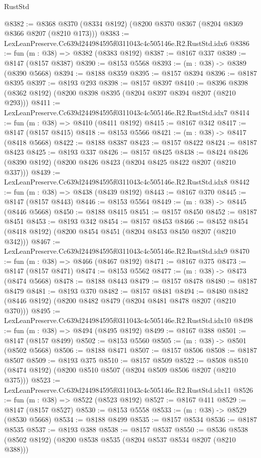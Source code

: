 \begin{lexlean}{RustStd}
\begin{coremodule}
@8382 := @8368 @8370 (@8334 @8192) (@8200 @8370 @8367 (@8204 @8369 @8366 @8207 (@8210 @173)))
@8383 := LexLeanPreserve.Cc639d244984595f0311043c4c505146e.R2.RustStd.idx6
@8386 := fun (m : @38) => @8382 (@8383 @8192)
@8387 := @8167 @337
@8389 := @8147 (@8157 @8387)
@8390 := @8153 @5568
@8393 := (m : @38) -> @8389 (@8390 @5668)
@8394 := @8188 @8359
@8395 := @8157 @8394
@8396 := @8187 @8395
@8397 := @8193 @293
@8398 := @8157 @8397
@8410 := @8396 @8398 (@8362 @8192) (@8200 @8398 @8395 (@8204 @8397 @8394 @8207 (@8210 @293)))
@8411 := LexLeanPreserve.Cc639d244984595f0311043c4c505146e.R2.RustStd.idx7
@8414 := fun (m : @38) => @8410 (@8411 @8192)
@8415 := @8167 @342
@8417 := @8147 (@8157 @8415)
@8418 := @8153 @5566
@8421 := (m : @38) -> @8417 (@8418 @5668)
@8422 := @8188 @8387
@8423 := @8157 @8422
@8424 := @8187 @8423
@8425 := @8193 @337
@8426 := @8157 @8425
@8438 := @8424 @8426 (@8390 @8192) (@8200 @8426 @8423 (@8204 @8425 @8422 @8207 (@8210 @337)))
@8439 := LexLeanPreserve.Cc639d244984595f0311043c4c505146e.R2.RustStd.idx8
@8442 := fun (m : @38) => @8438 (@8439 @8192)
@8443 := @8167 @370
@8445 := @8147 (@8157 @8443)
@8446 := @8153 @5564
@8449 := (m : @38) -> @8445 (@8446 @5668)
@8450 := @8188 @8415
@8451 := @8157 @8450
@8452 := @8187 @8451
@8453 := @8193 @342
@8454 := @8157 @8453
@8466 := @8452 @8454 (@8418 @8192) (@8200 @8454 @8451 (@8204 @8453 @8450 @8207 (@8210 @342)))
@8467 := LexLeanPreserve.Cc639d244984595f0311043c4c505146e.R2.RustStd.idx9
@8470 := fun (m : @38) => @8466 (@8467 @8192)
@8471 := @8167 @375
@8473 := @8147 (@8157 @8471)
@8474 := @8153 @5562
@8477 := (m : @38) -> @8473 (@8474 @5668)
@8478 := @8188 @8443
@8479 := @8157 @8478
@8480 := @8187 @8479
@8481 := @8193 @370
@8482 := @8157 @8481
@8494 := @8480 @8482 (@8446 @8192) (@8200 @8482 @8479 (@8204 @8481 @8478 @8207 (@8210 @370)))
@8495 := LexLeanPreserve.Cc639d244984595f0311043c4c505146e.R2.RustStd.idx10
@8498 := fun (m : @38) => @8494 (@8495 @8192)
@8499 := @8167 @388
@8501 := @8147 (@8157 @8499)
@8502 := @8153 @5560
@8505 := (m : @38) -> @8501 (@8502 @5668)
@8506 := @8188 @8471
@8507 := @8157 @8506
@8508 := @8187 @8507
@8509 := @8193 @375
@8510 := @8157 @8509
@8522 := @8508 @8510 (@8474 @8192) (@8200 @8510 @8507 (@8204 @8509 @8506 @8207 (@8210 @375)))
@8523 := LexLeanPreserve.Cc639d244984595f0311043c4c505146e.R2.RustStd.idx11
@8526 := fun (m : @38) => @8522 (@8523 @8192)
@8527 := @8167 @411
@8529 := @8147 (@8157 @8527)
@8530 := @8153 @5558
@8533 := (m : @38) -> @8529 (@8530 @5668)
@8534 := @8188 @8499
@8535 := @8157 @8534
@8536 := @8187 @8535
@8537 := @8193 @388
@8538 := @8157 @8537
@8550 := @8536 @8538 (@8502 @8192) (@8200 @8538 @8535 (@8204 @8537 @8534 @8207 (@8210 @388)))

\end{coremodule}
\end{lexlean}
